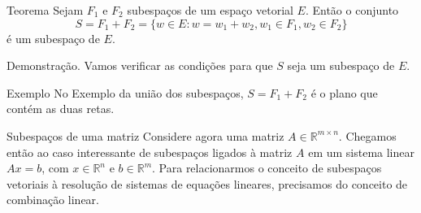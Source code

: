 \documentclass{beamer}
\begin{document}
\begin{darkframes}
\begin{frame}{}
  \begin{block}{Teorema}
  Sejam $F_1$ e $F_2$ subespaços de um espaço vetorial $E$. Então o conjunto
  \begin{equation*}
    S = F_1+F_2 = \{ w \in E : w = w_1+w_2, w_1\in F_1, w_2\in F_2\}
  \end{equation*}
  é um subespaço de $E$.
\end{block}
\vfill
\alert{Demonstração. } Vamos verificar as condições para que $S$ seja um subespaço de $E$.

\end{frame}

\begin{frame}{Exemplo}
  No Exemplo da união dos subespaços, $S = F_1+F_2$ é o plano que contém as duas retas.
\end{frame}

\begin{frame}{Subespaços de uma matriz}
  Considere agora uma matriz $A\in {\mathbb{R}}^{m\times n}$. Chegamos então ao caso interessante de subespaços ligados à matriz $A$ em um sistema linear $Ax=b$, com $x\in {\mathbb{R}}^n$ e $b\in {\mathbb{R}}^m$. Para relacionarmos o conceito de subespaços vetoriais à resolução de sistemas de equações lineares, precisamos do conceito de combinação linear.
\end{frame}


\end{darkframes}
\end{document}
